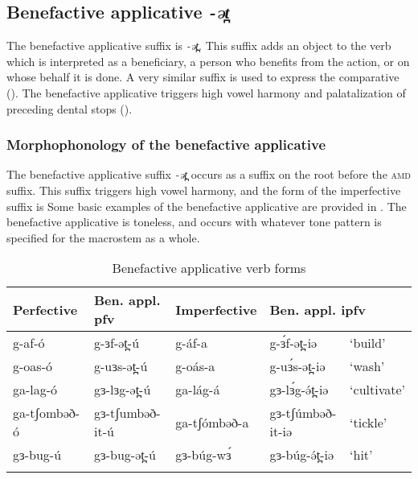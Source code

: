 %
%
%
%
%
%





\subsection{Benefactive applicative \textit{-ət̪}}\label{sec:ch11:benappl}

The benefactive applicative suffix is \textit{-ət̪}.  This suffix adds an object to the verb which is interpreted as a beneficiary, a person who benefits from the action, or on whose behalf it is done. A very similar suffix is used to express the comparative (). The benefactive applicative triggers high vowel harmony and palatalization of preceding dental stops ().

\subsubsection{Morphophonology of the benefactive applicative}

The benefactive applicative suffix \textit{-ət̪} occurs as a suffix on the root before the \textsc{amd} suffix. This suffix triggers high vowel harmony, and the form of the imperfective suffix is  Some basic examples of the benefactive applicative are provided in . The benefactive applicative is toneless, and occurs with whatever tone pattern is specified for the macrostem as a whole.

\begin{table}
\begin{tabular}[t]{lllll}
\lsptoprule
Perfective	& 	Ben. appl. pfv 	& Imperfective & \multicolumn{2}{l}{Ben. appl. ipfv} 	 \\
\midrule
g-af-ó			&	g-ɜf-ət̪-ú		&	g-áf-a		&	g-ɜ́f-ət̪-iə			& `build'\\%
g-oas-ó			& 	g-uɜs-ət̪-ú		& 	g-oás-a		& 	g-uɜ́s-ət̪-iə 	& ‘wash’	\\
ga-lag-ó		&	gɜ-lɜg-ət̪-ú		& 	ga-lág-á	&	gɜ-lɜ́g-ə́t̪-iə 	& ‘cultivate’\\ 
ga-tʃombəð-ó		&	gɜ-tʃumbəð-it-ú 		&	ga-tʃómbəð-a	&	gɜ-tʃúmbəð-it-iə 	 &	‘tickle’\\
gɜ-bug-ú		&	gɜ-bug-ət̪-ú		&	gɜ-búg-wɜ́	&	gɜ-búg-ə́t̪-iə	&	‘hit’\\ %
\lspbottomrule
\end{tabular}
\caption{Benefactive applicative verb forms} \label{tab:ch11:appl}    
\end{table}  

